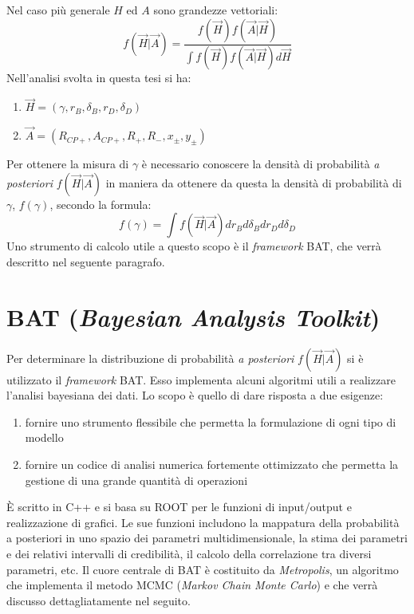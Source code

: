 Nel caso più generale $H$ ed $A$ sono grandezze vettoriali:
\begin{equation}
  f(\vec{H}|\vec{A}) = \frac{f(\vec{H})f(\vec{A}|\vec{H})}{\int f(\vec{H})f(\vec{A}|\vec{H})d\vec{H}}
\end{equation}
Nell'analisi svolta in questa tesi si ha:
\begin{enumerate}
 \item $\vec{H} = (\gamma, r_B, \delta_B, r_D, \delta_D)$
 \item $\vec{A} = (R_{CP+}, A_{CP+}, R_+, R_-, x_\pm, y_\pm)$
\end{enumerate}
Per ottenere la misura di $\gamma$ è necessario conoscere la densità di probabilità \emph{a posteriori} $f(\vec{H}|\vec{A})$ in maniera da ottenere da questa la densità
di probabilità di $\gamma$, $f(\gamma)$, secondo la formula:
\begin{equation}
 f(\gamma) = \int f(\vec{H}|\vec{A}) dr_Bd\delta_Bdr_Dd\delta_D
\end{equation}
Uno strumento di calcolo utile a questo scopo è il \emph{framework} BAT, che verrà descritto nel seguente paragrafo.

\section{BAT (\emph{Bayesian Analysis Toolkit})}
\noindent
Per determinare la distribuzione di probabilità \emph{a posteriori} $f(\vec{H}|\vec{A})$ si è utilizzato il \emph{framework} BAT.
Esso implementa alcuni algoritmi utili a realizzare l'analisi bayesiana dei dati.
Lo scopo  è quello di dare risposta a due esigenze:
\begin{enumerate}
 \item fornire uno strumento flessibile che permetta la formulazione di ogni tipo di modello
 \item fornire un codice di analisi numerica fortemente ottimizzato che permetta la gestione di una grande quantità di operazioni
\end{enumerate}
È scritto in C++ e si basa su ROOT per le funzioni di input/output e realizzazione di grafici.
Le sue funzioni includono la mappatura della probabilità a posteriori in uno spazio dei parametri multidimensionale,
la stima dei parametri e dei relativi intervalli di credibilità, il calcolo della correlazione tra diversi parametri, etc.
Il cuore centrale di BAT è costituito da \emph{Metropolis}, un algoritmo che implementa il metodo MCMC (\emph{Markov Chain Monte Carlo}) e che verrà discusso dettagliatamente nel seguito.
